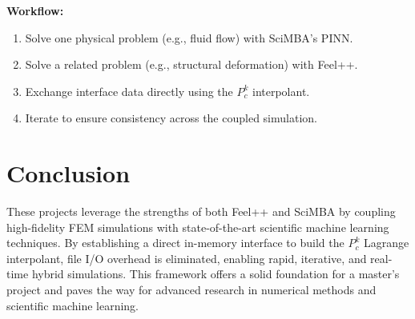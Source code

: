 \documentclass[11pt]{article}
\begin{document}
\textbf{Workflow:}
\begin{enumerate}[label=\arabic*.]
    \item Solve one physical problem (e.g., fluid flow) with SciMBA’s PINN.
    \item Solve a related problem (e.g., structural deformation) with Feel++.
    \item Exchange interface data directly using the \( P_c^k \) interpolant.
    \item Iterate to ensure consistency across the coupled simulation.
\end{enumerate}

\section{Conclusion}
These projects leverage the strengths of both Feel++ and SciMBA by coupling high-fidelity FEM simulations with state-of-the-art scientific machine learning techniques. By establishing a direct in-memory interface to build the \( P_c^k \) Lagrange interpolant, file I/O overhead is eliminated, enabling rapid, iterative, and real-time hybrid simulations. This framework offers a solid foundation for a master’s project and paves the way for advanced research in numerical methods and scientific machine learning.
\end{document}
